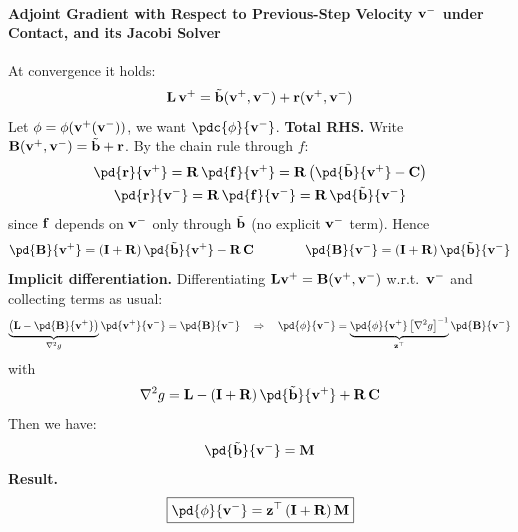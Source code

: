 \begin{derivation}
\paragraph{Adjoint Gradient with Respect to Previous-Step Velocity $\mathbf{v}^-$ under Contact, and its Jacobi Solver} \mbox{}

\noindent At convergence it holds:
\begin{equation*}
    \mathbf{L}\,\mathbf{v}^+ = \tilde{\mathbf{b}}(\mathbf{v}^+, \mathbf{v}^-) + \mathbf{r}(\mathbf{v}^+, \mathbf{v}^-)
\end{equation*}
Let $\phi = \phi(\mathbf{v}^+(\mathbf{v}^-))$, we want $\pdc{\phi}{\vv^-}$.
\newline \textbf{Total RHS.} Write $\mathbf{B}(\mathbf{v}^+,\mathbf{v}^-) = \tilde{\mathbf{b}} + \mathbf{r}$. By the chain rule through $f$:
\begin{gather*}
    \pd{\rr}{\vv^+} = \R\,\pd{\f}{\vv^+} = \R\left(\pd{\tilde{\bb}}{\vv^+} - \C\right)
    \\
    \pd{\rr}{\vv^-} = \R\,\pd{\f}{\vv^-} = \R\,\pd{\tilde{\bb}}{\vv^-}
\end{gather*}
since $\mathbf{f}$ depends on $\mathbf{v}^-$ only through $\tilde{\mathbf{b}}$ (no explicit $\mathbf{v}^-$ term). Hence
\begin{equation*}
    \pd{\B}{\vv^+}
    =
    \left(\I + \R\right)\pd{\tilde{\bb}}{\vv^+} - \R\,\C
    \qquad\qquad
    \pd{\B}{\vv^-}
    =
    \left(\I + \R\right)\pd{\tilde{\bb}}{\vv^-}
\end{equation*}
\newline \textbf{Implicit differentiation.} Differentiating $\mathbf{L}\mathbf{v}^+ = \mathbf{B}(\mathbf{v}^+,\mathbf{v}^-)$ w.r.t.\ $\mathbf{v}^-$ and collecting terms as usual:
\begin{equation*}
    \underbrace{\left(\LL - \pd{\B}{\vv^+}\right)}_{\nabla^2 g}
    \pd{\vv^+}{\vv^-}
    =
    \pd{\B}{\vv^-}
    \quad\Rightarrow\quad
    \pd{\phi}{\vv^-}
    =
    \underbrace{\pd{\phi}{\vv^+}\left[\nabla^2 g\right]^{-1}}_{\z^\top}
    \pd{\B}{\vv^-}
\end{equation*}
with
\begin{equation*}
\nabla^2 g
= 
\LL - \left(\I+\R\right)\pd{\tilde{\bb}}{\vv^+} + \R\,\C
\end{equation*}
Then we have:
\begin{equation*}
    \pd{\tilde{\bb}}{\vv^-} = \M
\end{equation*}
\newline \textbf{Result.}
\begin{equation}
    \boxed{
    \pd{\phi}{\vv^-}
    =
    \z^\top\left(\I + \R\right)\M
    }
\end{equation}

\end{derivation}
